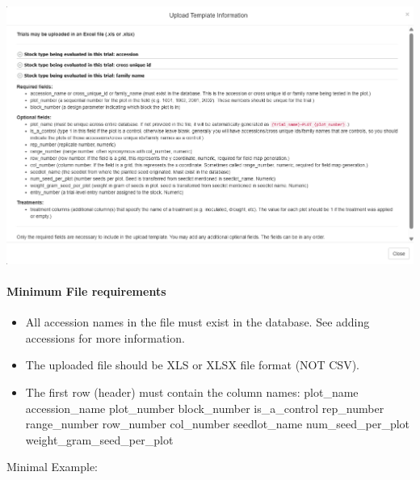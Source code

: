 \documentclass[
  12pt,
]{book}
\begin{document}
\begin{center}\includegraphics[width=0.95\linewidth]{assets/images/manage_trials_upload_trial_template} \end{center}

\hypertarget{minimum-file-requirements}{%
\paragraph*{Minimum File requirements}\label{minimum-file-requirements}}

\begin{itemize}
\item
  All accession names in the file must exist in the database. See adding accessions for more information.
\item
  The uploaded file should be XLS or XLSX file format (NOT CSV).
\item
  The first row (header) must contain the column names: plot\_name accession\_name plot\_number block\_number is\_a\_control rep\_number range\_number row\_number col\_number seedlot\_name num\_seed\_per\_plot weight\_gram\_seed\_per\_plot
\end{itemize}

Minimal Example:
\end{document}
